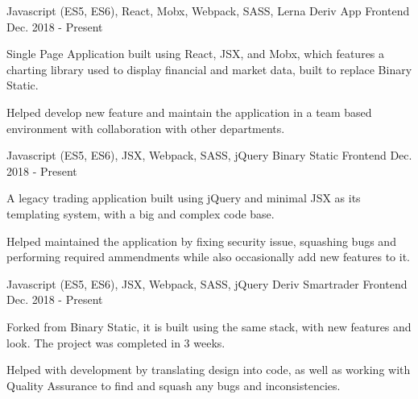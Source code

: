 

\begin{cventries}

  \cventry
    {Javascript (ES5, ES6), React, Mobx, Webpack, SASS, Lerna}
    {Deriv App}
    {Frontend}
    {Dec. 2018 - Present}
    {
      \begin{cvitems}
        \item {Single Page Application built using React, JSX, and Mobx, which features a charting library used to display financial and market data, built to replace Binary Static.}
        \item {Helped develop new feature and maintain the application in a team based environment with collaboration with other departments.}
      \end{cvitems}
    }

  \cventry
    {Javascript (ES5, ES6), JSX, Webpack, SASS, jQuery}
    {Binary Static}
    {Frontend}
    {Dec. 2018 - Present}
    {
      \begin{cvitems}
        \item {A legacy trading application built using jQuery and minimal JSX as its templating system, with a big and complex code base.}
        \item {Helped maintained the application by fixing security issue, squashing bugs and performing required ammendments while also occasionally add new features to it.}
      \end{cvitems}
    }

  \cventry
    {Javascript (ES5, ES6), JSX, Webpack, SASS, jQuery}
    {Deriv Smartrader}
    {Frontend}
    {Dec. 2018 - Present}
    {
      \begin{cvitems}
        \item {Forked from Binary Static, it is built using the same stack, with new features and look. The project was completed in 3 weeks.}
        \item {Helped with development by translating design into code, as well as working with Quality Assurance to find and squash any bugs and inconsistencies.}
      \end{cvitems}
    }
\end{cventries}
